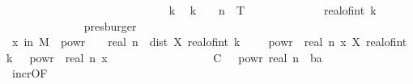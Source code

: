\begin{isabellebody}
\ \ \ \ \ \ \isamarkupfalse%
\ {\isacharminus}{\kern0pt}\isanewline
\ \ \ \ \ \ \ \ \isacommand{{\isacharbraceleft}{\kern0pt}}\isamarkupfalse%
\isanewline
\ \ \ \ \ \ \ \ \ \ \isamarkupfalse%
\ k\ \isamarkupfalse%
\ {\isachardoublequoteopen}k\ {\isasymin}\ {\isacharbraceleft}{\kern0pt}{}{\isachardot}{\kern0pt}{\isachardot}{\kern0pt}{\isasymlfloor}{}\ {\isacharcircum}{\kern0pt}\ n\ {\isacharasterisk}{\kern0pt}\ T{\isasymrfloor}{\isacharbraceright}{\kern0pt}{\isachardoublequoteclose}\isanewline
\ \ \ \ \ \ \ \ \ \ \isamarkupfalse%
\ \isamarkupfalse%
\ {\isachardoublequoteopen}real{\isacharunderscore}{\kern0pt}of{\isacharunderscore}{\kern0pt}int\ k\ {\isasymge}\ {}{\isachardoublequoteclose}\isanewline
\ \ \ \ \ \ \ \ \ \ \ \ \isamarkupfalse%
\ presburger\isanewline
\ \ \ \ \ \ \ \ \ \ \isamarkupfalse%
\ \isamarkupfalse%
\ {\isachardoublequoteopen}{\isasymP}{\isacharparenleft}{\kern0pt}x\ in\ {\isacharquery}{\kern0pt}M{\isachardot}{\kern0pt}\ {}\ powr\ {\isacharparenleft}{\kern0pt}{\isacharminus}{\kern0pt}\ {\isasymgamma}\ {\isacharasterisk}{\kern0pt}\ real\ n{\isacharparenright}{\kern0pt}\ {\isasymle}\ dist\ {\isacharparenleft}{\kern0pt}X\ {\isacharparenleft}{\kern0pt}real{\isacharunderscore}{\kern0pt}of{\isacharunderscore}{\kern0pt}int\ {\isacharparenleft}{\kern0pt}k\ {\isacharminus}{\kern0pt}\ {}{\isacharparenright}{\kern0pt}\ {\isacharasterisk}{\kern0pt}\ {}\ powr\ {\isacharminus}{\kern0pt}\ real\ n{\isacharparenright}{\kern0pt}\ x{\isacharparenright}{\kern0pt}\ {\isacharparenleft}{\kern0pt}X\ {\isacharparenleft}{\kern0pt}real{\isacharunderscore}{\kern0pt}of{\isacharunderscore}{\kern0pt}int\ k\ {\isacharasterisk}{\kern0pt}\ {}\ powr\ {\isacharminus}{\kern0pt}\ real\ n{\isacharparenright}{\kern0pt}\ x{\isacharparenright}{\kern0pt}{\isacharparenright}{\kern0pt}\isanewline
\ \ \ \ \ \ \ \ \ \ \ \ \ \ \ \ \ {\isasymle}\ C\ {\isacharasterisk}{\kern0pt}\ {}\ powr\ {\isacharparenleft}{\kern0pt}{\isacharminus}{\kern0pt}{\isacharparenleft}{\kern0pt}real\ n{\isacharparenright}{\kern0pt}\ {\isacharasterisk}{\kern0pt}\ {\isacharparenleft}{\kern0pt}{}{\isacharplus}{\kern0pt}b{\isacharminus}{\kern0pt}a{\isacharasterisk}{\kern0pt}{\isasymgamma}{\isacharparenright}{\kern0pt}{\isacharparenright}{\kern0pt}{\isachardoublequoteclose}\isanewline
\ \ \ \ \ \ \ \ \ \ \ \ \isamarkupfalse%
\ incr{\isacharbrackleft}{\kern0pt}OF\ {\isacartoucheopen}{\isasymgamma}\ {\isachargreater}{\kern0pt}\ {}{\isacartoucheclose}{\isacharbrackright}{\kern0pt}\ \isamarkupfalse%

\end{isabellebody}
